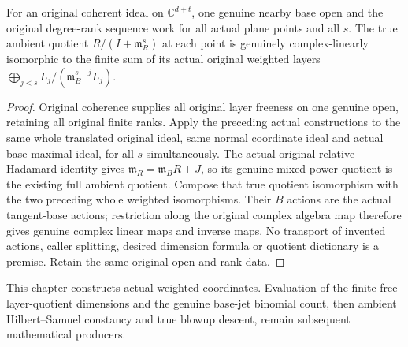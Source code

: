 \begin{theorem}
\label{hir:relative-normal-original-nearby-ambient-weighted-layer-decomposition}
\leanok
For an original coherent ideal on $\mathbb C^{d+t}$, one genuine
nearby base open and the original degree-rank sequence work for all
actual plane points and all $s$. The true ambient quotient
$R/(I+\mathfrak m_R^s)$ at each point is genuinely complex-linearly
isomorphic to the finite sum of its actual original weighted layers
$\bigoplus_{j<s}L_j/(\mathfrak m_B^{s-j}L_j)$.
\end{theorem}
\begin{proof}
Original coherence supplies all original layer freeness on one genuine
open, retaining all original finite ranks. Apply the preceding actual
constructions to the same whole translated original ideal, same normal
coordinate ideal and actual base maximal ideal, for all $s$ simultaneously.
The actual original relative Hadamard identity gives
$\mathfrak m_R=\mathfrak m_BR+J$, so its genuine mixed-power quotient
is the existing full ambient quotient. Compose that true quotient
isomorphism with the two preceding whole weighted isomorphisms.
Their $B$ actions are the actual tangent-base actions; restriction
along the original complex algebra map therefore gives genuine complex
linear maps and inverse maps. No transport of invented actions, caller
splitting, desired dimension formula or quotient dictionary is a premise.
Retain the same original open and rank data.
\end{proof}

This chapter constructs actual weighted coordinates. Evaluation of the
finite free layer-quotient dimensions and the genuine base-jet binomial
count, then ambient Hilbert--Samuel constancy and true blowup descent,
remain subsequent mathematical producers.
